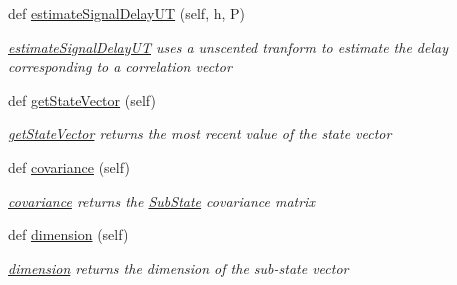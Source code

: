 \begin{DoxyCompactItemize}
def \hyperlink{classSignalCorrelationSubstate_1_1CorrelationFilter_aa9e1991566655a89ed084b6918cfb278}{estimate\+Signal\+Delay\+UT} (self, h, P)
\begin{DoxyCompactList}\small\item\em \hyperlink{classSignalCorrelationSubstate_1_1CorrelationFilter_aa9e1991566655a89ed084b6918cfb278}{estimate\+Signal\+Delay\+UT} uses a unscented tranform to estimate the delay corresponding to a correlation vector \end{DoxyCompactList}\item 
def \hyperlink{classSubStates_1_1SubState_a3ebd1a120f63ed477ee76999518a8828}{get\+State\+Vector} (self)
\begin{DoxyCompactList}\small\item\em \hyperlink{classSubStates_1_1SubState_a3ebd1a120f63ed477ee76999518a8828}{get\+State\+Vector} returns the most recent value of the state vector \end{DoxyCompactList}\item 
def \hyperlink{classSubStates_1_1SubState_a4d863939fdb98b2739e1e737ec7496ae}{covariance} (self)
\begin{DoxyCompactList}\small\item\em \hyperlink{classSubStates_1_1SubState_a4d863939fdb98b2739e1e737ec7496ae}{covariance} returns the \hyperlink{classSubStates_1_1SubState}{Sub\+State} covariance matrix \end{DoxyCompactList}\item 
def \hyperlink{classSubStates_1_1SubState_a4aebea19a134cb871a7c0b6c2709546a}{dimension} (self)
\begin{DoxyCompactList}\small\item\em \hyperlink{classSubStates_1_1SubState_a4aebea19a134cb871a7c0b6c2709546a}{dimension} returns the dimension of the sub-\/state vector \end{DoxyCompactList}\end{DoxyCompactItemize}
